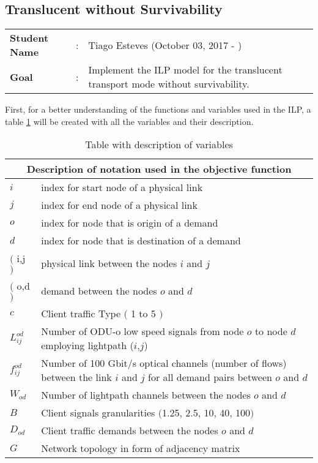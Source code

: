\clearpage

\subsection{Translucent without Survivability}\label{ILP_Transluc_Survivability}
\begin{tcolorbox}	
\begin{tabular}{p{2.75cm} p{0.2cm} p{10.5cm}} 	
\textbf{Student Name}  &:& Tiago Esteves    (October 03, 2017 - )\\
\textbf{Goal}          &:& Implement the ILP model for the translucent transport mode without survivability.
\end{tabular}
\end{tcolorbox}
\vspace{11pt}

First, for a better understanding of the functions and variables used in the ILP, a table \ref{description_transluc} will be created with all the variables and their description. \\

\begin{table}[h!]
\centering
\begin{tabular}{ |p{1cm}||p{13cm}|}
 \hline
 \multicolumn{2}{|c|}{Description of notation used in the objective function} \\
 \hline
 \hline
 $i$ & index for start node of a physical link \\
 $j$ & index for end node of a physical link \\
 $o$ & index for node that is origin of a demand \\
 $d$ & index for node that is destination of a demand \\
 $($ i,j $)$ & physical link between the nodes $i$ and $j$ \\
 $($ o,d $)$ & demand between the nodes $o$ and $d$ \\
 $c$ & Client traffic Type $($ 1 to 5 $)$ \\
 $L_{ij}^{od}$ & Number of ODU-o low speed signals from node $o$ to node $d$ employing lightpath ($i$,$j$) \\
 $f_{ij}^{od}$ & Number of 100 Gbit/s optical channels (number of flows) between the link $i$ and $j$ for all demand pairs between $o$ and $d$ \\
 $W_{od}$ & Number of lightpath channels between the nodes $o$ and $d$ \\
 $B$ & Client signals granularities $($1.25, 2.5, 10, 40, 100$)$ \\
 $D_{od}$ & Client traffic demands between the nodes $o$ and $d$ \\
 $G$ & Network topology in form of adjacency matrix \\
 \hline
\end{tabular}
\caption{Table with description of variables}
\label{description_transluc}
\end{table}


